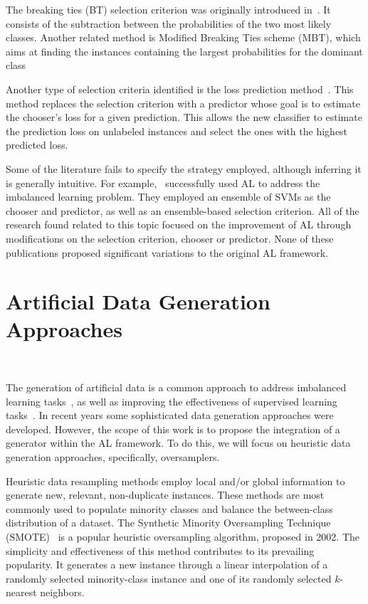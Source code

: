 \documentclass[preprint,12pt]{elsarticle}
\begin{document}
The breaking ties (BT) selection criterion was originally introduced
in~\cite{Luo2003}. It consists of the subtraction between the probabilities of
the two most likely classes. Another related method is Modified Breaking Ties
scheme (MBT), which aims at finding the instances containing the largest
probabilities for the dominant class~\cite{Liu2018,Li2013a}

Another type of selection criteria identified is the loss prediction
method~\cite{Yoo2019}. This method replaces the selection criterion with a
predictor whose goal is to estimate the chooser's loss for a given
prediction. This allows the new classifier to estimate the prediction loss on
unlabeled instances and select the ones with the highest predicted loss.

Some of the literature fails to specify the strategy employed, although
inferring it is generally intuitive. For example,~\cite{Ertekin2007}
successfully used AL to address the imbalanced learning problem. They employed
an ensemble of SVMs as the chooser and predictor, as well as an ensemble-based
selection criterion. All of the research found related to this topic focused on
the improvement of AL through modifications on the selection criterion, chooser
or predictor. None of these publications proposed significant variations to the
original AL framework.

\section{Artificial Data Generation Approaches}~\label{sec:ovs-sota}

The generation of artificial data is a common approach to address imbalanced
learning tasks~\cite{Kaur2019}, as well as improving the effectiveness of
supervised learning tasks~\cite{DeVries2017}. In recent years some
sophisticated data generation approaches were developed. However, the scope of
this work is to propose the integration of a generator within the AL
framework. To do this, we will focus on heuristic data generation approaches,
specifically, oversamplers.

Heuristic data resampling methods employ local and/or global information to
generate new, relevant, non-duplicate instances. These methods are most
commonly used to populate minority classes and balance the between-class
distribution of a dataset. The Synthetic Minority Oversampling Technique
(SMOTE)~\cite{Chawla2002} is a popular heuristic oversampling
algorithm, proposed in 2002. The simplicity and effectiveness of this method
contributes to its prevailing popularity. It generates a new instance
through a linear interpolation of a randomly selected
minority-class instance and one of its randomly
selected $k$-nearest neighbors. 
\end{document}
